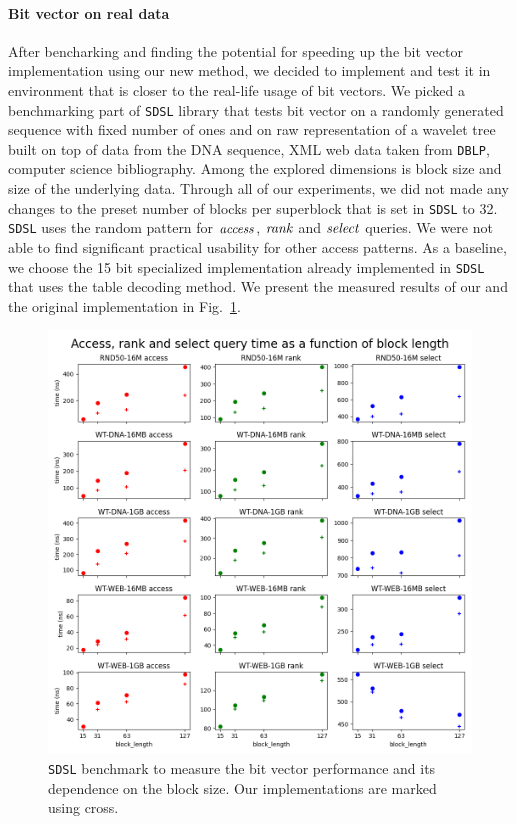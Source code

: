 \paragraph{Bit vector on real data}

After bencharking and finding the potential for speeding up the bit vector implementation using
our new method, we decided to implement and test it in environment that is closer to the real-life
usage of bit vectors. We picked a benchmarking part of \texttt{SDSL} library that tests bit vector
on a randomly generated sequence with fixed number of ones and on raw representation of a wavelet
tree built on top of data from the DNA sequence, XML web data taken from \texttt{DBLP}, computer
science bibliography. Among the explored dimensions is block size and size of the underlying data.
Through all of our experiments, we did not made any changes to the preset number of blocks per
superblock that is set in \texttt{SDSL} to 32. \texttt{SDSL} uses the random pattern for $\mathit{access}$,
$\mathit{rank}$ and $\mathit{select}$ queries. We were not able to find significant practical usability for other
access patterns. As a baseline, we choose the 15 bit specialized implementation already implemented
in \texttt{SDSL} that uses the table decoding method. We present the measured results of our and
the original implementation in Fig.~\ref{obr:benchmark_sdsl_new_method}.

\begin{figure}
	\centerline{
		\includegraphics[width=\textwidth, height=0.7\textheight]{images/benchmark_sdsl_new_method}
	}
	\caption[TODO]{\texttt{SDSL} benchmark to measure the bit vector performance and its dependence
	on the block size. Our implementations are marked using cross.
	}
	\label{obr:benchmark_sdsl_new_method}
\end{figure}

